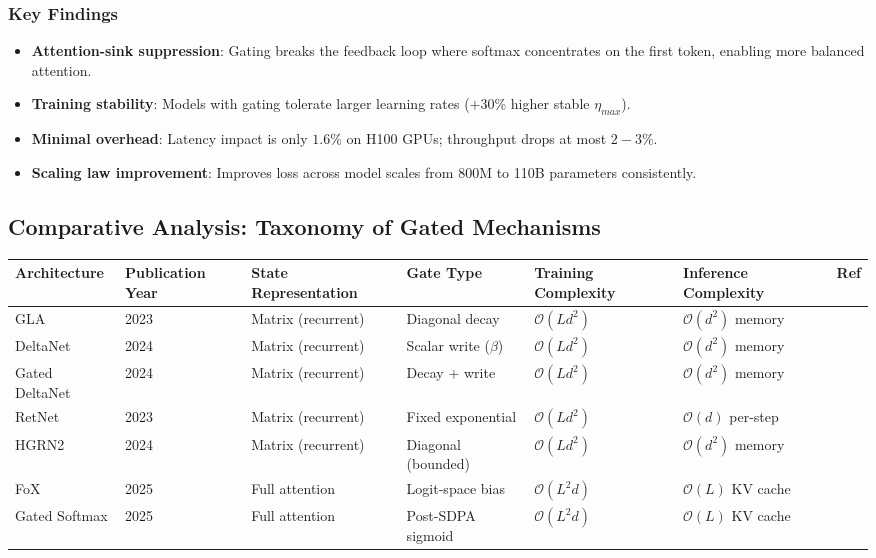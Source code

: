 \documentclass[11pt,a4paper]{article}
\begin{document}
\subsubsection{Key Findings}

\begin{itemize}[leftmargin=*]
    \item \textbf{Attention-sink suppression}: Gating breaks the feedback loop where softmax concentrates on the first token, enabling more balanced attention.
    \item \textbf{Training stability}: Models with gating tolerate larger learning rates ($+30\%$ higher stable $\eta_{max}$).
    \item \textbf{Minimal overhead}: Latency impact is only $1.6\%$ on H100 GPUs; throughput drops at most $2-3\%$.
    \item \textbf{Scaling law improvement}: Improves loss across model scales from 800M to 110B parameters consistently.
\end{itemize}

\normalsize

\subsection{Comparative Analysis: Taxonomy of Gated Mechanisms}

\footnotesize
\begin{longtable}{p{1.8cm}p{1.7cm}p{1.8cm}p{1.6cm}p{2.0cm}p{2.4cm}p{1.3cm}}
\toprule
\textbf{Architecture} & \textbf{Publication Year} & \textbf{State Representation} & \textbf{Gate Type} & \textbf{Training Complexity} & \textbf{Inference Complexity} & \textbf{Ref} \\
\midrule
\endhead
GLA & 2023 & Matrix (recurrent) & Diagonal decay & $\mathcal{O}(Ld^2)$ & $\mathcal{O}(d^2)$ memory & \citep{yang_gla_2023} \\
DeltaNet & 2024 & Matrix (recurrent) & Scalar write ($\beta$) & $\mathcal{O}(Ld^2)$ & $\mathcal{O}(d^2)$ memory & \citep{yang_deltanet_2024} \\
Gated DeltaNet & 2024 & Matrix (recurrent) & Decay + write & $\mathcal{O}(Ld^2)$ & $\mathcal{O}(d^2)$ memory & \citep{yang_gated_deltanet_2024} \\
RetNet & 2023 & Matrix (recurrent) & Fixed exponential & $\mathcal{O}(Ld^2)$ & $\mathcal{O}(d)$ per-step & \citep{sun_retentive_2023} \\
HGRN2 & 2024 & Matrix (recurrent) & Diagonal (bounded) & $\mathcal{O}(Ld^2)$ & $\mathcal{O}(d^2)$ memory & \citep{qin_hgrn2_2024} \\
FoX & 2025 & Full attention & Logit-space bias & $\mathcal{O}(L^2d)$ & $\mathcal{O}(L)$ KV cache & \citep{lin_forgetting_transformer_2025} \\
Gated Softmax & 2025 & Full attention & Post-SDPA sigmoid & $\mathcal{O}(L^2d)$ & $\mathcal{O}(L)$ KV cache & \citep{qiu_gated_attention_2025} \\
\bottomrule
\end{longtable}
\normalsize
\end{document}
